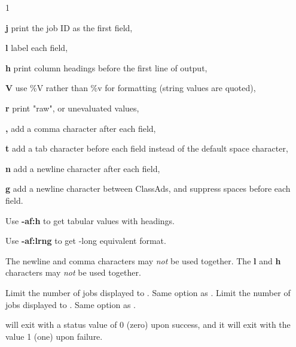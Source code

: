 \begin{ManPage}{\label{man-condor-history}}{1}
\begin{Options}
{    \textbf{j} print the job ID as the first field,

    \textbf{l} label each field,

    \textbf{h} print column headings before the first line of output,

    \textbf{V} use \%V rather than \%v for formatting (string values
    are quoted),

    \textbf{r} print "raw", or unevaluated values,

    \textbf{,} add a comma character after each field,

    \textbf{t} add a tab character before each field instead of 
    the default space character,

    \textbf{n} add a newline character after each field,

    \textbf{g} add a newline character between ClassAds, and
    suppress spaces before each field.

    Use \textbf{-af:h} to get tabular values with headings.

    Use \textbf{-af:lrng} to get -long equivalent format.

    The newline and comma characters may \emph{not} be used together.
    The \textbf{l} and \textbf{h} characters may \emph{not} be used
    together.
    }
    {Limit the number of jobs displayed to .  Same option as
    . }
    {Limit the number of jobs displayed to . Same option as
    . } 
\end{Options}

\ExitStatus

 will exit with a status value of 0 (zero) upon success,
and it will exit with the value 1 (one) upon failure.

\end{ManPage}
